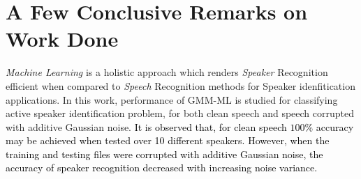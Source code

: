 \documentclass{article}
\begin{document}
{\section{\textbf{{A Few Conclusive Remarks on Work Done}}}
\label{conclusion}
\textit{Machine Learning} is a holistic approach which renders \textit{Speaker} Recognition efficient when compared to \textit{Speech} Recognition methods for Speaker idenfitication applications. %
In this work, performance of GMM-ML is studied for classifying active speaker identification problem, for both clean speech and speech corrupted with additive Gaussian noise. \textcolor{black}{It is observed that, for clean speech $100\%$ accuracy may be achieved when tested over 10 different speakers. However, when the training and testing files were corrupted with additive Gaussian noise, the accuracy of speaker recognition decreased with increasing noise variance. }}
%
\end{document}
